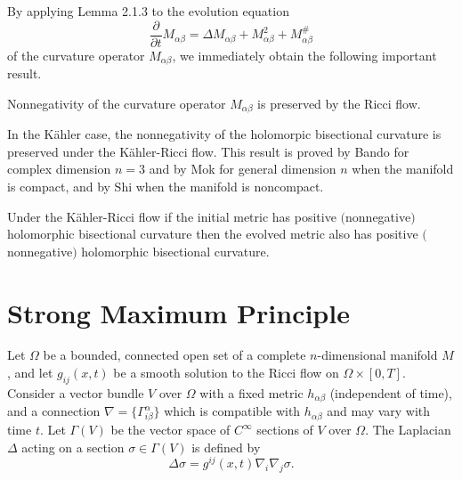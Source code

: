 By applying Lemma 2.1.3 to the evolution equation
$$
\frac{\partial}{\partial t}M_{\alpha\beta} =\Delta
M_{\alpha\beta}+M_{\alpha\beta}^2+M_{\alpha\beta}^\#
$$
of the curvature operator $M_{\alpha\beta}$, we immediately obtain
the following important result.

\begin{proposition}
  \label{prop:cz-preservation-of-nonnegative-curvature-operator}
Nonnegativity of the curvature operator $M_{\alpha\beta}$ is
preserved by the Ricci flow.
\end{proposition}   %

In the K\"ahler case, the nonnegativity of the holomorpic
bisectional curvature is preserved under the K\"ahler-Ricci flow.
This result is proved by Bando \cite{Bando} for complex dimension
$n=3$ and by Mok \cite{Mo88} for general dimension $n$ when the
manifold is compact, and by Shi \cite{Sh90} when the manifold is
noncompact.

\begin{proposition}
  \label{prop:cz-preservation-of-holomorphic-bisectional-curvature}
Under the K\"ahler-Ricci flow if the initial metric has positive
$($nonnegative$)$ holomorphic bisectional curvature then the
evolved metric also has positive $($nonnegative$)$ holomorphic
bisectional curvature.
\end{proposition}   %


\section{Strong Maximum Principle}

Let $\Omega$ be a bounded, connected open set of a complete
$n$-dimensional manifold $M$, and let $g_{ij}(x,t)$ be a smooth
solution to the Ricci flow on $\Omega \times [0,T]$. Consider a
vector bundle $V$ over $\Omega$ with a fixed metric
$h_{\alpha\beta}$ (independent of time), and a connection $\nabla
= \{\Gamma^\alpha_{i\beta}\}$ which is compatible with
$h_{\alpha\beta}$ and may vary with time $t$. Let $\Gamma(V)$ be
the vector space of $C^\infty$ sections of $V$ over $\Omega$. The
Laplacian $\Delta$ acting on a section $\sigma\in\Gamma(V)$ is
defined by
$$
\Delta\sigma=g^{ij}(x,t)\nabla_i \nabla_j\sigma.
$$

